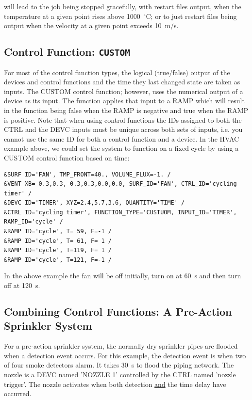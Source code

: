 \documentclass[11pt]{book}
\begin{document}
\noindent
will lead to the job being stopped gracefully, with restart files output, when the temperature at a given point rises above
1000~$^\circ$C; or to just restart files being output when the velocity at a given point exceeds 10~m/s.



\subsection{Control Function: \texorpdfstring{{\tt CUSTOM}}{CUSTOM} }

For most of the
control function types, the logical (true/false) output of the devices and control functions and the time they last changed
state are taken as inputs.  The {\ct CUSTOM} control function; however, uses the numerical output of a
device as its input.  The function applies that input to a {\ct RAMP} which will result in the function being false when
the {\ct RAMP} is negative and true when the {\ct RAMP} is positive. Note that when using control functions the {\ct ID}s assigned to both the
{\ct CTRL} and the {\ct DEVC} inputs must be unique across both sets of inputs, i.e. you cannot use the
same {\ct ID} for both a control function and a device.  In the HVAC example above, we could set the system to function
on a fixed cycle by using a {\ct CUSTOM} control function based on time:

\footnotesize
\begin{verbatim}
&SURF ID='FAN', TMP_FRONT=40., VOLUME_FLUX=-1. /
&VENT XB=-0.3,0.3,-0.3,0.3,0.0,0.0, SURF_ID='FAN', CTRL_ID='cycling timer' /
&DEVC ID='TIMER', XYZ=2.4,5.7,3.6, QUANTITY='TIME' /
&CTRL ID='cycling timer', FUNCTION_TYPE='CUSTUOM, INPUT_ID='TIMER', RAMP_ID='cycle' /
&RAMP ID='cycle', T= 59, F=-1 /
&RAMP ID='cycle', T= 61, F= 1 /
&RAMP ID='cycle', T=119, F= 1 /
&RAMP ID='cycle', T=121, F=-1 /
\end{verbatim} \normalsize

\noindent
In the above example the fan will be off initially, turn on at 60~s and then turn off at 120~s.


\subsection{Combining Control Functions: A Pre-Action Sprinkler System}

For a pre-action sprinkler system, the normally
dry sprinkler pipes are flooded when a detection event occurs. For this example, the detection event is
when two of four smoke detectors alarm.  It takes 30~s to flood the piping network.
The nozzle is a {\ct DEVC} named {\ct 'NOZZLE 1'} controlled by the {\ct CTRL} named {\ct 'nozzle trigger'}.
The nozzle activates when both detection \underline{and} the time delay have occurred.
\end{document}

